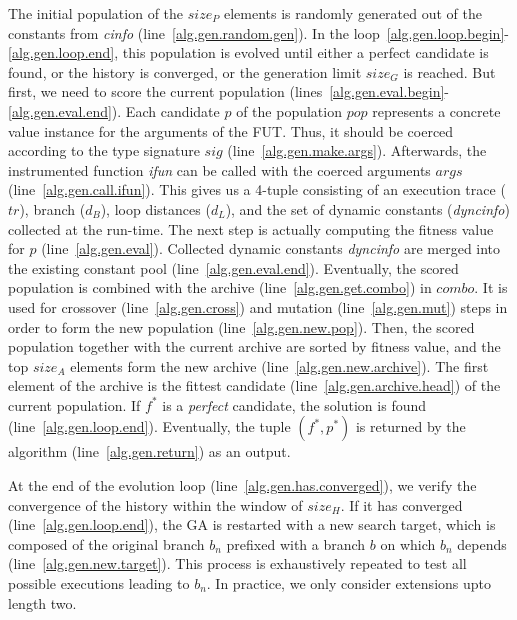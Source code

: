 The initial population of the $size_P$ elements is randomly generated out of the constants from \emph{cinfo} (line~\ref{alg.gen.random.gen}). In the loop~\ref{alg.gen.loop.begin}-\ref{alg.gen.loop.end}, this population is evolved until either a perfect candidate is found, or the history is converged, or the generation limit $size_G$ is reached. But first, we need to score the current population (lines~\ref{alg.gen.eval.begin}-\ref{alg.gen.eval.end}). Each candidate $p$ of the population $pop$ represents a concrete value instance for the arguments of the FUT. Thus, it should be coerced according to the type signature $sig$ (line~\ref{alg.gen.make.args}). Afterwards, the instrumented function \emph{ifun} can be called with the coerced arguments $args$ (line~\ref{alg.gen.call.ifun}). This gives us a 4-tuple consisting of an execution trace ($tr$), branch ($d_B$), loop distances ($d_L$), and the set of dynamic constants (\emph{dyncinfo}) collected at the run-time. The next step is actually computing the fitness value for $p$ (line~\ref{alg.gen.eval}). Collected dynamic constants \emph{dyncinfo} are merged into the existing constant pool (line~\ref{alg.gen.eval.end}). Eventually, the scored population is combined with the archive (line~\ref{alg.gen.get.combo}) in $combo$. It is used for crossover (line~\ref{alg.gen.cross}) and mutation (line~\ref{alg.gen.mut}) steps in order to form the new population (line~\ref{alg.gen.new.pop}). Then, the scored population together with the current archive are sorted by fitness value, and the top $size_A$ elements form the new archive (line~\ref{alg.gen.new.archive}). The first element of the archive is the fittest candidate (line~\ref{alg.gen.archive.head}) of the current population. If $f^*$ is a \emph{perfect} candidate, the solution is found (line~\ref{alg.gen.loop.end}). Eventually, the tuple $(f^*, p^*)$ is returned by the algorithm (line~\ref{alg.gen.return}) as an output.

At the end of the evolution loop (line~\ref{alg.gen.has.converged}), we verify the convergence of the history within the window of $size_H$. If it has converged (line~\ref{alg.gen.loop.end}), the GA is restarted with a new search target, which is composed of the original branch $b_n$ prefixed with a branch $b$ on which $b_n$ depends (line~\ref{alg.gen.new.target}). This process is exhaustively repeated to test all possible executions leading to $b_n$. In practice, we only consider extensions upto length two.

